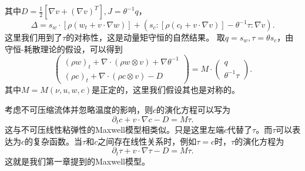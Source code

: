 \documentclass{article}
\begin{document}
	其中$D = \frac{1}{2} [\nabla v + (\nabla v)^T], J =\theta^{-1} q $，
	\begin{equation*}
		\Delta = s_w \cdot [\rho (w_t + v \cdot \nabla w)] + (s_c:[\rho (c_t + v \cdot \nabla v)] - \theta^{-1} \tau : \nabla v) .
	\end{equation*}
	这里我们用到了$\tau$的对称性，这是动量矩守恒的自然结果\cite{}。
	取$q =s_w,\tau = \theta s_c$，由守恒-耗散理论的假设，可以得到
	\begin{equation} \label{eq:CDFgeneral  }
		\left( \begin{array}{c} 
			(\rho w)_t +  \nabla \cdot (\rho w \otimes v)  + \nabla \theta^{-1} \\
			(\rho c)_t +  \nabla \cdot (\rho c \otimes v)  - D
		\end{array} \right) = M \cdot
		\left( \begin{array}{c} 
			q \\ \theta^{-1} \tau
		\end{array}\right).
	\end{equation}
	其中$M=M(\nu,u,w,c)$是正定的，这里我们假设其也是对称的。

	考虑不可压缩流体并忽略温度的影响，则$c$的演化方程可以写为
	\begin{equation*}
		\partial_t c + v \cdot \nabla c - D = M \tau.
		\end{equation*}
	这与不可压线性粘弹性的Maxwell模型相类似。只是这里左端$c$代替了$\tau$。而$\tau$可以表达为$c$的复杂函数。当$\tau$和$c$之间存在线性关系时，例如$\tau = c$时，$\tau$的演化方程为
	\begin{equation*}
		\partial_t \tau+ v \cdot \nabla \tau - D = M \tau.
	\end{equation*}
	这就是我们第一章提到的Maxwell模型。
\end{document}
